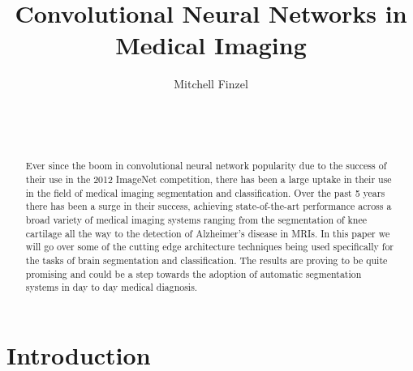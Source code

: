 \documentclass{sig-alternate}
\begin{document}

\title{Convolutional Neural Networks in Medical Imaging}


\author{
\alignauthor
Mitchell Finzel\\
	\\
	\\
	\\
}

\maketitle
\begin{abstract}
Ever since the boom in convolutional neural network popularity due to the success of their use in the 2012 ImageNet competition, there has been a large uptake in their use in the field of medical imaging segmentation and classification. Over the past 5 years there has been a surge in their success, achieving state-of-the-art performance across a broad variety of medical imaging systems ranging from the segmentation of knee cartilage all the way to the detection of Alzheimer's disease in MRIs. In this paper we will go over some of the cutting edge architecture techniques being used specifically for the tasks of brain segmentation and classification. The results are proving to be quite promising and could be a step towards the adoption of automatic segmentation systems in day to day medical diagnosis.

\end{abstract}


\section{Introduction}
\label{sec:introduction}
\end{document}
